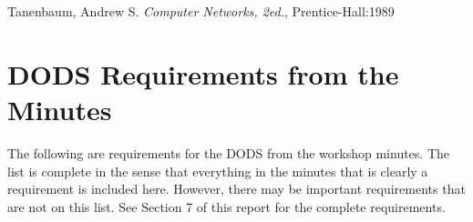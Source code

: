 \newpage
\begin{thebibliography}{99}
 Tanenbaum, Andrew S. 
{\em Computer Networks, 2ed.},
Prentice-Hall:1989
\end{thebibliography}

\newpage


\appendix

\section{\bf DODS Requirements from the Minutes}

\bigskip

The following are requirements for the DODS from the workshop minutes. The
list is complete in the sense that everything in the minutes that is clearly
a requirement is included here. However, there may be important requirements
that are not on this list. See Section 7 of this report for the complete
requirements. 

